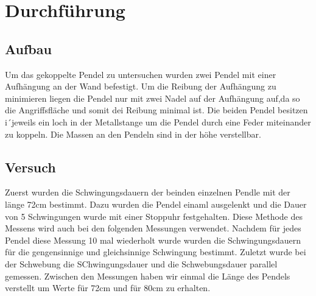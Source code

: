 \section{Durchführung}
\label{sec:Durchfuehrung}
\subsection{Aufbau}
    Um das gekoppelte Pendel zu untersuchen wurden zwei Pendel mit einer Aufhängung an der Wand befestigt.
    Um die Reibung der Aufhängung zu minimieren liegen die Pendel nur mit zwei Nadel auf der Aufhängung auf,da so die Angriffsfläche und somit dei Reibung minimal ist.
    Die beiden Pendel besitzen i´jeweils ein loch in der Metallstange um die Pendel durch eine Feder miteinander zu koppeln.
    Die Massen an den Pendeln sind in der höhe verstellbar.
\subsection{Versuch}
    Zuerst wurden die Schwingungsdauern der beinden einzelnen Pendle mit der länge 72cm bestimmt.
    Dazu wurden die Pendel einaml ausgelenkt und die Dauer von 5 Schwingungen wurde mit einer Stoppuhr festgehalten.
    Diese Methode des Messens wird auch bei den folgenden Messungen verwendet.
    Nachdem für jedes Pendel diese Messung 10 mal wiederholt wurde wurden die Schwingungsdauern für die gengensinnige und gleichsinnige Schwingung bestimmt.
    Zuletzt wurde bei der Schwebung die SChwingungsdauer und die Schwebungsdauer parallel gemessen.
    Zwischen den Messungen haben wir einmal die Länge des Pendels verstellt um Werte für 72cm und für 80cm zu erhalten.